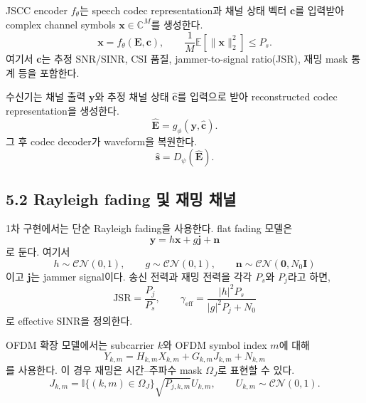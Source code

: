 \documentclass[11pt,a4paper]{article}
\begin{document}
JSCC encoder $f_{\theta}$는 speech codec representation과 채널 상태 벡터 $\bm{c}$를 입력받아 complex channel symbols $\bm{x}\in\mathbb{C}^{M}$를 생성한다.
\begin{equation}
    \bm{x} = f_{\theta}(\bm{E},\bm{c}), \qquad
    \frac{1}{M}\mathbb{E}\left[\|\bm{x}\|_2^2\right] \le P_s.
\end{equation}
여기서 $\bm{c}$는 추정 SNR/SINR, CSI 품질, jammer-to-signal ratio(JSR), 재밍 mask 통계 등을 포함한다.

수신기는 채널 출력 $\bm{y}$와 추정 채널 상태 $\hat{\bm{c}}$를 입력으로 받아 reconstructed codec representation을 생성한다.
\begin{equation}
    \hat{\bm{E}} = g_{\phi}(\bm{y},\hat{\bm{c}}).
\end{equation}
그 후 codec decoder가 waveform을 복원한다.
\begin{equation}
    \hat{\bm{s}} = D_{\psi}(\hat{\bm{E}}).
\end{equation}

\subsection{5.2 Rayleigh fading 및 재밍 채널}
1차 구현에서는 단순 Rayleigh fading을 사용한다. flat fading 모델은
\begin{equation}
    \bm{y} = h\bm{x} + g\bm{j} + \bm{n}
\end{equation}
로 둔다. 여기서
\begin{equation}
    h\sim \mathcal{CN}(0,1), \qquad g\sim \mathcal{CN}(0,1), \qquad \bm{n}\sim \mathcal{CN}(\bm{0},N_0\bm{I})
\end{equation}
이고 $\bm{j}$는 jammer signal이다. 송신 전력과 재밍 전력을 각각 $P_s$와 $P_j$라고 하면,
\begin{equation}
    \mathrm{JSR}=\frac{P_j}{P_s}, \qquad
    \gamma_{\mathrm{eff}} = \frac{|h|^2 P_s}{|g|^2 P_j + N_0}
\end{equation}
로 effective SINR을 정의한다.

OFDM 확장 모델에서는 subcarrier $k$와 OFDM symbol index $m$에 대해
\begin{equation}
    Y_{k,m}=H_{k,m}X_{k,m}+G_{k,m}J_{k,m}+N_{k,m}
\end{equation}
를 사용한다. 이 경우 재밍은 시간--주파수 mask $\Omega_J$로 표현할 수 있다.
\begin{equation}
    J_{k,m}=\mathbb{I}\{(k,m)\in\Omega_J\}\sqrt{P_{j,k,m}}U_{k,m}, \qquad U_{k,m}\sim\mathcal{CN}(0,1).
\end{equation}
\end{document}
